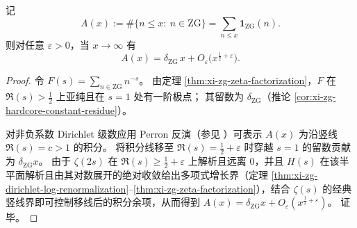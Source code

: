 
\begin{theorem}\label{thm:xi-zg-counting-power-saving-error}
记
\[
A(x):=\#\{n\le x:\ n\in\mathrm{ZG}\}
=\sum_{n\le x}\mathbf 1_{\mathrm{ZG}}(n).
\]
则对任意 \(\varepsilon>0\)，当 \(x\to\infty\) 有
\[
A(x)=\delta_{\mathrm{ZG}}\,x+O_\varepsilon\!\bigl(x^{\frac12+\varepsilon}\bigr).
\]
\end{theorem}

\begin{proof}
令 \(F(s)=\sum_{n\in\mathrm{ZG}}n^{-s}\)。
由定理 \ref{thm:xi-zg-zeta-factorization}，\(F\) 在 \(\Re(s)>\tfrac12\) 上亚纯且在 \(s=1\) 处有一阶极点；
其留数为 \(\delta_{\mathrm{ZG}}\)（推论 \ref{cor:xi-zg-hardcore-constant-residue}）。
\par
对非负系数 Dirichlet 级数应用 Perron 反演（参见 \cite{Apostol1976,Titchmarsh1986RiemannZeta}）可表示 \(A(x)\) 为沿竖线 \(\Re(s)=c>1\) 的积分。
将积分线移至 \(\Re(s)=\tfrac12+\varepsilon\) 时穿越 \(s=1\) 的留数贡献为 \(\delta_{\mathrm{ZG}}x\)。
由于 \(\zeta(2s)\) 在 \(\Re(s)\ge\tfrac12+\varepsilon\) 上解析且远离 \(0\)，并且 \(H(s)\) 在该半平面解析且由其对数展开的绝对收敛给出多项式增长界（定理 \ref{thm:xi-zg-dirichlet-log-renormalization}--\ref{thm:xi-zg-zeta-factorization}），结合 \(\zeta(s)\) 的经典竖线界即可控制移线后的积分余项，从而得到
\(
A(x)=\delta_{\mathrm{ZG}}x+O_\varepsilon(x^{\frac12+\varepsilon})
\)。
证毕。
\end{proof}


